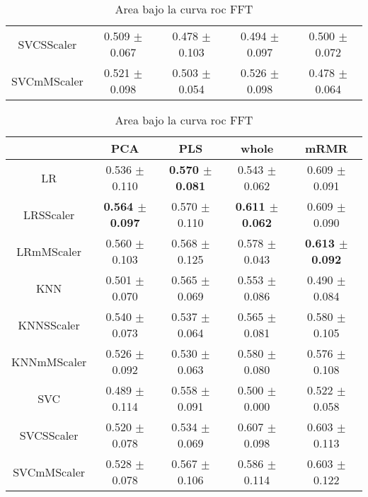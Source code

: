 \documentclass[]{report}
\begin{document}
\begin{table}
\begin{tabular}{c|cccc}
			 SVCSScaler  & 0.509 $\pm$ 0.067 & 0.478 $\pm$ 0.103 & 0.494 $\pm$ 0.097 & 0.500 $\pm$ 0.072 \\
			 SVCmMScaler & 0.521 $\pm$ 0.098 & 0.503 $\pm$ 0.054 & 0.526 $\pm$ 0.098 & 0.478 $\pm$ 0.064 \\
			\hline
		\end{tabular}
		\caption{\label{tab:auc_score_DCOR} Area bajo la curva roc DCOR}
		\vspace*{2cm}
		\begin{tabular}{c|cccc}
			\hline
			             & PCA             & PLS             & whole           & mRMR            \\
			\hline
			 LR          & 0.536 $\pm$ 0.110 & \textbf{0.570 $\pm$ 0.081} & 0.543 $\pm$ 0.062 & 0.609 $\pm$ 0.091 \\
			 LRSScaler   & \textbf{0.564 $\pm$ 0.097} & 0.570 $\pm$ 0.110 & \textbf{0.611 $\pm$ 0.062} & 0.609 $\pm$ 0.090 \\
			 LRmMScaler  & 0.560 $\pm$ 0.103 & 0.568 $\pm$ 0.125 & 0.578 $\pm$ 0.043 & \textbf{0.613 $\pm$ 0.092} \\
			 KNN         & 0.501 $\pm$ 0.070 & 0.565 $\pm$ 0.069 & 0.553 $\pm$ 0.086 & 0.490 $\pm$ 0.084 \\
			 KNNSScaler  & 0.540 $\pm$ 0.073 & 0.537 $\pm$ 0.064 & 0.565 $\pm$ 0.081 & 0.580 $\pm$ 0.105 \\
			 KNNmMScaler & 0.526 $\pm$ 0.092 & 0.530 $\pm$ 0.063 & 0.580 $\pm$ 0.080 & 0.576 $\pm$ 0.108 \\
			 SVC         & 0.489 $\pm$ 0.114 & 0.558 $\pm$ 0.091 & 0.500 $\pm$ 0.000 & 0.522 $\pm$ 0.058 \\
			 SVCSScaler  & 0.520 $\pm$ 0.078 & 0.534 $\pm$ 0.069 & 0.607 $\pm$ 0.098 & 0.603 $\pm$ 0.113 \\
			 SVCmMScaler & 0.528 $\pm$ 0.078 & 0.567 $\pm$ 0.106 & 0.586 $\pm$ 0.114 & 0.603 $\pm$ 0.122 \\
			\hline
		\end{tabular}
		\caption{\label{tab:auc_score_FFT} Area bajo la curva roc FFT}
		\vspace*{2cm}
	\end{table}
\end{document}
